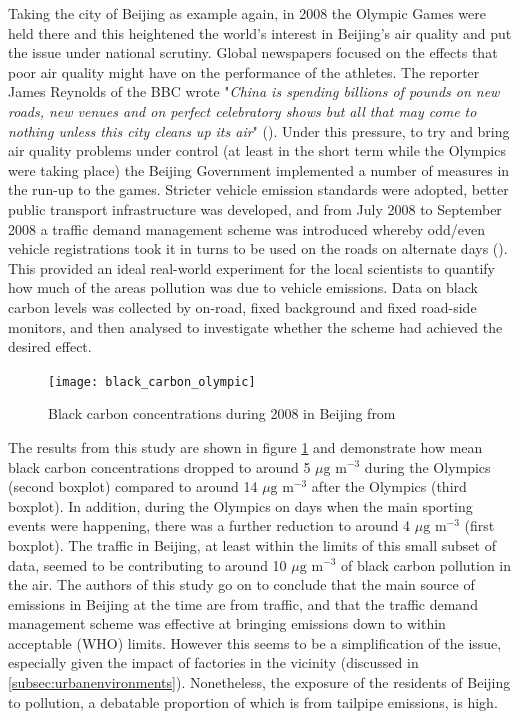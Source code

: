 Taking the city of Beijing as example again, in 2008 the Olympic Games were held there and this heightened the world’s interest in Beijing's air quality and put the issue under national scrutiny. Global newspapers focused on the effects that poor air quality might have on the performance of the athletes. The reporter James Reynolds of the BBC wrote "\textit{China is spending billions of pounds on new roads, new venues and on perfect celebratory shows but all that may come to nothing unless this city cleans up its air}" (\cite{BBC2007}). Under this pressure, to try and bring air quality problems under control (at least in the short term while the Olympics were taking place) the Beijing Government implemented a number of measures in the run-up to the games. Stricter vehicle emission standards were adopted, better public transport infrastructure was developed, and from July 2008 to September 2008 a traffic demand management scheme was introduced whereby odd/even vehicle registrations took it in turns to be used on the roads on alternate days (\cite{Wang2009}). This provided an ideal real-world experiment for the local scientists to quantify how much of the areas pollution was due to vehicle emissions. Data on black carbon levels was collected by on-road, fixed background and fixed road-side monitors, and then analysed to investigate whether the scheme had achieved the desired effect.

\begin{figure}[H]
\centering
\texttt{[image: black\_carbon\_olympic]}
\caption{Black carbon concentrations during 2008 in Beijing from \cite{Wang2009}}
\label{fig:blackcarbonolympic}
\end{figure}

The results from this study are shown in figure \ref{fig:blackcarbonolympic} and demonstrate how mean black carbon concentrations dropped to around 5 $\mu \text{g m}^{-3}$ during the Olympics (second boxplot) compared to around 14 $\mu \text{g m}^{-3}$ after the Olympics (third boxplot). In addition, during the Olympics on days when the main sporting events were happening, there was a further reduction to around 4 $\mu \text{g m}^{-3}$ (first boxplot). The traffic in Beijing, at least within the limits of this small subset of data, seemed to be contributing to around 10 $\mu \text{g m}^{-3}$ of black carbon pollution in the air. The authors of this study go on to conclude that the main source of emissions in Beijing at the time are from traffic, and that the traffic demand management scheme was effective at bringing emissions down to within acceptable (WHO) limits. However this seems to be a simplification of the issue, especially given the impact of factories in the vicinity (discussed in \ref{subsec:urbanenvironments}). Nonetheless, the exposure of the residents of Beijing to pollution, a debatable proportion of which is from tailpipe emissions, is high.

